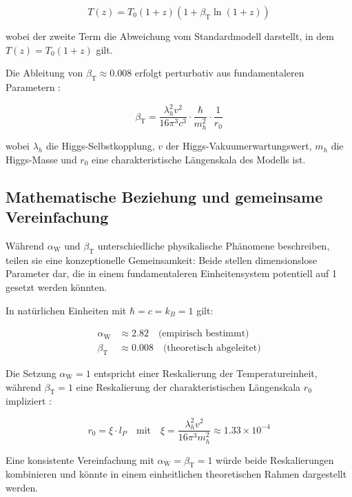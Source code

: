 \documentclass[12pt,a4paper]{article}
\newcommand{\betaT}{\beta_{\text{T}}}
\newcommand{\alphaW}{\alpha_{\text{W}}}
\begin{document}
	\begin{equation}
		T(z) = T_0 (1 + z) (1 + \betaT \ln(1 + z))
	\end{equation}
	
	wobei der zweite Term die Abweichung vom Standardmodell darstellt, in dem \(T(z) = T_0 (1 + z)\) gilt.
	
	Die Ableitung von \(\betaT \approx 0.008\) erfolgt perturbativ aus fundamentaleren Parametern \cite{pascher_params_2025}:
	
	\begin{equation}
		\betaT = \frac{\lambda_h^2 v^2}{16\pi^3 c^3} \cdot \frac{\hbar}{m_h^2} \cdot \frac{1}{r_0}
	\end{equation}
	
	wobei \(\lambda_h\) die Higgs-Selbstkopplung, \(v\) der Higgs-Vakuumerwartungswert, \(m_h\) die Higgs-Masse und \(r_0\) eine charakteristische Längenskala des Modells ist.
	
	\subsection{Mathematische Beziehung und gemeinsame Vereinfachung}
	
	Während \(\alphaW\) und \(\betaT\) unterschiedliche physikalische Phänomene beschreiben, teilen sie eine konzeptionelle Gemeinsamkeit: Beide stellen dimensionslose Parameter dar, die in einem fundamentaleren Einheitensystem potentiell auf 1 gesetzt werden könnten.
	
	In natürlichen Einheiten mit \(\hbar = c = k_B = 1\) gilt:
	
	\begin{align}
		\alphaW &\approx 2.82 \quad \text{(empirisch bestimmt)} \\
		\betaT &\approx 0.008 \quad \text{(theoretisch abgeleitet)}
	\end{align}
	
	Die Setzung \(\alphaW = 1\) entspricht einer Reskalierung der Temperatureinheit, während \(\betaT = 1\) eine Reskalierung der charakteristischen Längenskala \(r_0\) impliziert \cite{pascher_params_2025}:
	
	\begin{equation}
		r_0 = \xi \cdot l_P \quad \text{mit} \quad \xi = \frac{\lambda_h^2 v^2}{16\pi^3 m_h^2} \approx 1.33 \times 10^{-4}
	\end{equation}
	
	Eine konsistente Vereinfachung mit \(\alphaW = \betaT = 1\) würde beide Reskalierungen kombinieren und könnte in einem einheitlichen theoretischen Rahmen dargestellt werden.
	
\end{document}
